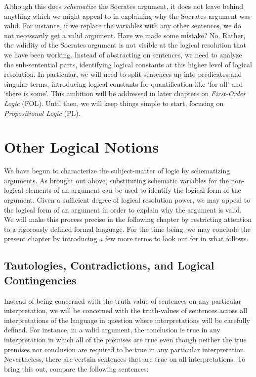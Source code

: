 \begin{earg}
  \eitem{$\metaA$}
  \uitem{$\metaB$\quad}
  \eitem{$\metaC$}
\end{earg}

Although this does \textit{schematize} the Socrates argument, it does not leave behind anything which we might appeal to in explaining why the Socrates argument was valid.
For instance, if we replace the variables with any other sentences, we do not necessarily get a valid argument.
Have we made some mistake?
No.
Rather, the validity of the Socrates argument is not visible at the logical resolution that we have been working.
Instead of abstracting on sentences, we need to analyze the sub-sentential parts, identifying logical constants at this higher level of logical resolution.
In particular, we will need to split sentences up into predicates and singular terms, introducing logical constants for quantification like `for all' and `there is some'.
This ambition will be addressed in later chapters on \textit{First-Order Logic} (FOL).
Until then, we will keep things simple to start, focusing on \textit{Propositional Logic} (PL).





\section{Other Logical Notions}

We have begun to characterize the subject-matter of logic by schematizing arguments.
As brought out above, substituting schematic variables for the non-logical elements of an argument can be used to identify the logical form of the argument.
Given a sufficient degree of logical resolution power, we may appeal to the logical form of an argument in order to explain why the argument is valid.
We will make this process precise in the following chapter by restricting attention to a rigorously defined formal language.
For the time being, we may conclude the present chapter by introducing a few more terms to look out for in what follows.


\subsection{Tautologies, Contradictions, and Logical Contingencies}
\label{sec-tautologydef}

Instead of being concerned with the truth value of sentences on any particular interpretation, we will be concerned with the truth-values of sentences across all interpretations of the language in question where interpretations will be carefully defined.
For instance, in a valid argument, the conclusion is true in any interpretation in which all of the premises are true even though neither the true premises nor conclusion are required to be true in any particular interpretation.
Nevertheless, there are certain sentences that are true on all interpretations.
To bring this out, compare the following sentences:

